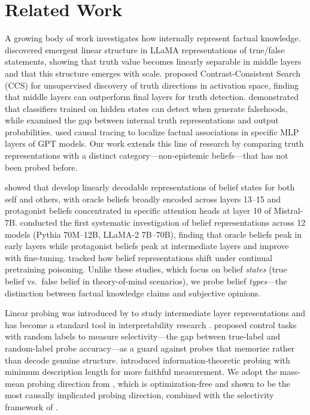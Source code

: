 \section{Related Work}
\label{sec:related_work}

A growing body of work investigates how \llms internally represent factual knowledge. \citet{marks2023geometry} discovered emergent linear structure in LLaMA representations of true/false statements, showing that truth value becomes linearly separable in middle layers and that this structure emerges with scale. \citet{burns2023discovering} proposed Contrast-Consistent Search (CCS) for unsupervised discovery of truth directions in activation space, finding that middle layers can outperform final layers for truth detection. \citet{azaria2023internal} demonstrated that classifiers trained on hidden states can detect when \llms generate falsehoods, while \citet{liu2023cognitive} examined the gap between internal truth representations and output probabilities. \citet{meng2022locating} used causal tracing to localize factual associations in specific MLP layers of GPT models. Our work extends this line of research by comparing truth representations with a distinct category---non-epistemic beliefs---that has not been probed before.

\citet{zhu2024language} showed that \llms develop linearly decodable representations of belief states for both self and others, with oracle beliefs broadly encoded across layers 13--15 and protagonist beliefs concentrated in specific attention heads at layer 10 of Mistral-7B. \citet{bortoletto2024brittle} conducted the first systematic investigation of belief representations across 12 models (Pythia 70M--12B, LLaMA-2 7B--70B), finding that oracle beliefs peak in early layers while protagonist beliefs peak at intermediate layers and improve with fine-tuning. \citet{churina2025layer} tracked how belief representations shift under continual pretraining poisoning. Unlike these studies, which focus on belief \emph{states} (true belief vs.\ false belief in theory-of-mind scenarios), we probe belief \emph{types}---the distinction between factual knowledge claims and subjective opinions.

Linear probing was introduced by \citet{alain2016understanding} to study intermediate layer representations and has become a standard tool in interpretability research \citep{conneau2018probing,belinkov2022probing}. \citet{hewitt2019designing} proposed control tasks with random labels to measure selectivity---the gap between true-label and random-label probe accuracy---as a guard against probes that memorize rather than decode genuine structure. \citet{voita2020information} introduced information-theoretic probing with minimum description length for more faithful measurement. We adopt the mass-mean probing direction from \citet{marks2023geometry}, which is optimization-free and shown to be the most causally implicated probing direction, combined with the selectivity framework of \citet{hewitt2019designing}.

